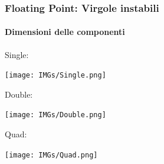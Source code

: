 \documentclass{beamer}
\begin{document}
	  \begin{frame}
	    \frametitle{Floating Point: Virgole instabili}
	    \framesubtitle{Dimensioni delle componenti}
			Single:
			
			\begin{center}
				\texttt{[image: IMGs/Single.png]}
			\end{center}
			\vspace{1em}
			Double:
			
			\begin{center}
				\texttt{[image: IMGs/Double.png]}
			\end{center}
			\vspace{1em}
			Quad:
			
			\begin{center}
				\texttt{[image: IMGs/Quad.png]}
			\end{center}
	  \end{frame}
\end{document}
